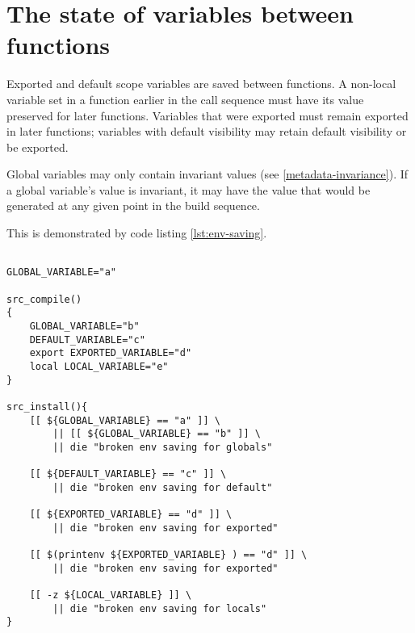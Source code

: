 \section{The state of variables between functions}
\label{ebuild-env-state}

Exported and default scope variables are saved between functions. A non-local variable set in a
function earlier in the call sequence must have its value preserved for later functions. Variables
that were exported must remain exported in later functions; variables with default visibility may
retain default visibility or be exported.

Global variables may only contain invariant values (see \ref{metadata-invariance}). If a global
variable's value is invariant, it may have the value that would be generated at any given point
in the build sequence.

This is demonstrated by code listing \ref{lst:env-saving}.

\begin{lstlisting}[float,caption=Environment state between functions,label=lst:env-saving]

GLOBAL_VARIABLE="a"

src_compile()
{
    GLOBAL_VARIABLE="b"
    DEFAULT_VARIABLE="c"
    export EXPORTED_VARIABLE="d"
    local LOCAL_VARIABLE="e"
}

src_install(){
    [[ ${GLOBAL_VARIABLE} == "a" ]] \
        || [[ ${GLOBAL_VARIABLE} == "b" ]] \
        || die "broken env saving for globals"

    [[ ${DEFAULT_VARIABLE} == "c" ]] \
        || die "broken env saving for default"

    [[ ${EXPORTED_VARIABLE} == "d" ]] \
        || die "broken env saving for exported"

    [[ $(printenv ${EXPORTED_VARIABLE} ) == "d" ]] \
        || die "broken env saving for exported"

    [[ -z ${LOCAL_VARIABLE} ]] \
        || die "broken env saving for locals"
}
\end{lstlisting}

